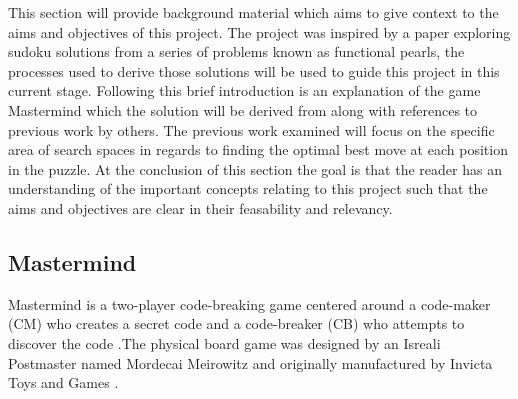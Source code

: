 \documentclass[12pt]{article}  %
\theoremstyle{definition}
\theoremstyle{remark}
\begin{document}
This section will provide background material which aims to give context to the aims and objectives of this project. The project was inspired by a paper exploring sudoku solutions from a series of problems known as functional pearls, the processes used to derive those solutions will be used to guide this project in this current stage. Following this brief introduction is an explanation of the game Mastermind which the solution will be derived from along with references to previous work by others. The previous work examined will focus on the specific area of search spaces in regards to finding the optimal best move at each position in the puzzle. At the conclusion of this section the goal is that the reader has an understanding of the important concepts relating to this project such that the aims and objectives are clear in their feasability and relevancy.

\subsection {Mastermind}

Mastermind is a two-player code-breaking game centered around a code-maker (CM) who creates a secret code and a code-breaker (CB) who attempts to discover the code \cite{Wolfram}.The physical board game was designed by an Isreali Postmaster named Mordecai Meirowitz and originally manufactured by Invicta Toys and Games \cite{Invicta}. 
\end{document}
